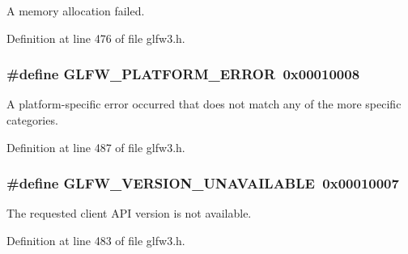 A memory allocation failed. 



Definition at line 476 of file glfw3.\-h.

\hypertarget{group__errors_gad44162d78100ea5e87cdd38426b8c7a1}{
\subsubsection[{G\-L\-F\-W\-\_\-\-P\-L\-A\-T\-F\-O\-R\-M\-\_\-\-E\-R\-R\-O\-R}]{\setlength{\rightskip}{0pt plus 5cm}\#define G\-L\-F\-W\-\_\-\-P\-L\-A\-T\-F\-O\-R\-M\-\_\-\-E\-R\-R\-O\-R~0x00010008}}\label{group__errors_gad44162d78100ea5e87cdd38426b8c7a1}


A platform-\/specific error occurred that does not match any of the more specific categories. 



Definition at line 487 of file glfw3.\-h.

\hypertarget{group__errors_gad16c5565b4a69f9c2a9ac2c0dbc89462}{
\subsubsection[{G\-L\-F\-W\-\_\-\-V\-E\-R\-S\-I\-O\-N\-\_\-\-U\-N\-A\-V\-A\-I\-L\-A\-B\-L\-E}]{\setlength{\rightskip}{0pt plus 5cm}\#define G\-L\-F\-W\-\_\-\-V\-E\-R\-S\-I\-O\-N\-\_\-\-U\-N\-A\-V\-A\-I\-L\-A\-B\-L\-E~0x00010007}}\label{group__errors_gad16c5565b4a69f9c2a9ac2c0dbc89462}


The requested client A\-P\-I version is not available. 



Definition at line 483 of file glfw3.\-h.

